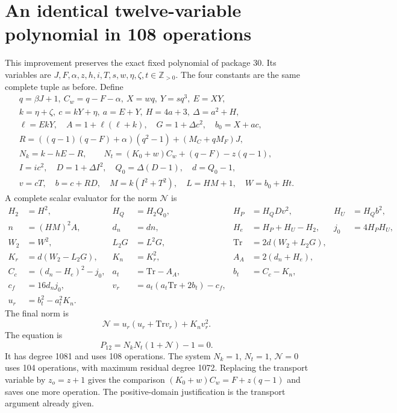 \documentclass[11pt]{article}
\theoremstyle{remark}\newtheorem{remark}[theorem]{Remark}
\newcommand{\Pos}{\mathbb Z_{>0}}\newcommand{\Q}{\mathbb Q}
\begin{document}
\section{An identical twelve-variable polynomial in 108 operations}\label{sec:positive12}
This improvement preserves the exact fixed polynomial of package 30.
Its variables are $J,F,\alpha,z,h,i,T,s,w,\eta,\zeta,t\in\Pos$.
The four constants are the same complete tuple as before. Define
\begin{gather*}
 q=\beta J+1,\ C_w=q-F-\alpha,\ X=wq,\ Y=sq^3,\ E=XY,\\
 k=\eta+\zeta,\ c=kY+\eta,\ a=E+Y,\ H=4a+3,\ \Delta=a^2+H,\\
 \ell=EkY,\quad A=1+\ell(\ell+k),\quad G=1+\Delta c^2,\quad b_0=X+ac,\\
 R=((q-1)(q-F)+\alpha)(q^2-1)+(M_C+qM_F)J,\\
 N_k=k-hE-R,\qquad N_t=(K_0+w)C_w+(q-F)-z(q-1),\\
 I=ic^2,\quad D=1+\Delta I^2,\quad Q_0=\Delta(D-1),\quad d=Q_0-1,\\
 v=cT,\quad b=c+RD,\quad M=k(I^2+T^2),\quad L=HM+1,\quad W=b_0+Ht.
\end{gather*}
A complete scalar evaluator for the norm $\mathcal N$ is
\begin{align*}
 H_2&=H^2,& H_Q&=H_2Q_0,& H_P&=H_QDv^2,&H_U&=H_Qb^2,\\
 n&=(HM)^2A,&d_n&=dn,&H_e&=H_P+H_U-H_2,&j_0&=4H_PH_U,\\
 W_2&=W^2,& L_2G&=L^2G,&\mathrm{Tr}&=2d(W_2+L_2G),&&\\
 K_r&=d(W_2-L_2G),&K_n&=K_r^2,&A_A&=2(d_n+H_e),&&\\
 C_c&=(d_n-H_e)^2-j_0,&a_t&=\mathrm{Tr}-A_A,&b_t&=C_c-K_n,&&\\
 c_f&=16d_nj_0,&v_r&=a_t(a_t\mathrm{Tr}+2b_t)-c_f,&&&&\\
 u_r&=b_t^2-a_t^2K_n.&&&&&&
\end{align*}
The final norm is
\[
 \mathcal N=u_r(u_r+\mathrm{Tr}v_r)+K_nv_r^2.
\]
The equation is
\[
 \boxed{\ P_{12}=N_kN_t(1+\mathcal N)-1=0.\ }
\]
It has degree 1081 and uses 108 operations. The system
$N_k=1$, $N_t=1$, $\mathcal N=0$ uses 104 operations, with maximum
residual degree 1072. Replacing the transport variable by $z_o=z+1$ gives
the comparison $(K_0+w)C_w=F+z(q-1)$ and saves one more operation.
The positive-domain justification is the transport argument already given.
\end{document}
